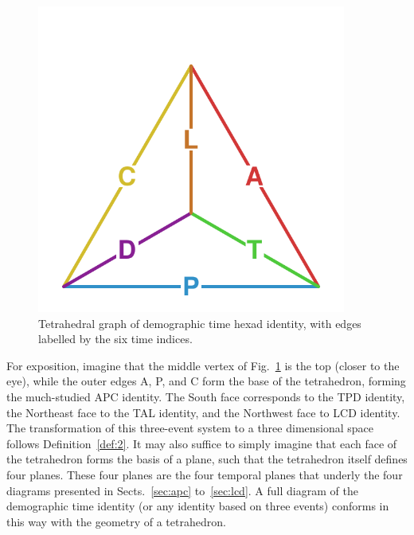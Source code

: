 \documentclass[12pt,oneside,a4paper,doublespacing]{article} %
\theoremstyle{definition}
\begin{document}
\begin{figure}[h!]
\centering
\caption{Tetrahedral graph of demographic time hexad identity, with edges
labelled by the six time indices.}
\label{fig:tet}
\includegraphics[width=4in]{Figures/TetraHedronEdgesOnly.pdf}%
\end{figure}

For exposition, imagine that the middle vertex of Fig.~\ref{fig:tet} is the
top (closer to the eye), while the outer edges A, P, and C form the
base of the tetrahedron, forming the much-studied APC identity.
The South face corresponds to the TPD identity,
the Northeast face to the TAL identity, and the
Northwest face to LCD identity. The transformation of this three-event
system to a three dimensional space follows Definition~\ref{def:2}.
It may also suffice to simply imagine that each face of the tetrahedron forms
the basis of a plane, such that the tetrahedron itself defines four planes. These four planes are the four temporal planes that underly
the four diagrams presented in Sects.~\ref{sec:apc} to~\ref{sec:lcd}. A full
diagram of the demographic time identity (or any identity based on three events)
conforms in this way with the geometry of a tetrahedron.
\end{document}
